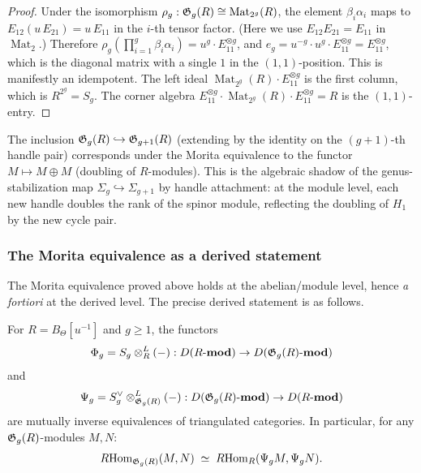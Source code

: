 \begin{proof}
Under the isomorphism
$\rho_g : \mathfrak{G}_g(R) \cong \operatorname{Mat}_{2^g}(R)$,
the element $\beta_i\alpha_i$ maps to
$E_{12}(u\,E_{21}) = u\,E_{11}$
in the $i$-th tensor factor.
(Here we use $E_{12}E_{21} = E_{11}$ in $\operatorname{Mat}_2$.)
Therefore
$\rho_g\!\left(\prod_{i=1}^g \beta_i\alpha_i\right)
= u^g \cdot E_{11}^{\otimes g}$,
and $e_g = u^{-g} \cdot u^g \cdot E_{11}^{\otimes g}
= E_{11}^{\otimes g}$, which is the diagonal matrix with
a single $1$ in the $(1,1)$-position.
This is manifestly an idempotent.
The left ideal $\operatorname{Mat}_{2^g}(R) \cdot E_{11}^{\otimes g}$
is the first column, which is $R^{2^g} = S_g$.
The corner algebra
$E_{11}^{\otimes g} \cdot \operatorname{Mat}_{2^g}(R)
\cdot E_{11}^{\otimes g} = R$ is the $(1,1)$-entry.
\end{proof}

\begin{remark}
The inclusion $\mathfrak{G}_g(R) \hookrightarrow \mathfrak{G}_{g+1}(R)$
(extending by the identity on the $(g{+}1)$-th handle pair)
corresponds under the Morita equivalence to the functor
$M \mapsto M \oplus M$ (doubling of $R$-modules).
This is the algebraic shadow of the genus-stabilization map
$\Sigma_g \hookrightarrow \Sigma_{g+1}$ by
handle attachment: at the module level, each new handle
doubles the rank of the spinor module, reflecting the
doubling of $H_1$ by the new cycle pair.
\end{remark}

\subsubsection{The Morita equivalence as a derived statement}

The Morita equivalence proved above holds at the
abelian/module level, hence \emph{a fortiori} at the derived level.
The precise derived statement is as follows.

\begin{theorem}
For $R = B_\Theta[u^{-1}]$ and $g \geq 1$, the functors
\[
\Phi_g = S_g \otimes_R^L (-) :
D(R\text{-}\mathbf{mod}) \to D(\mathfrak{G}_g(R)\text{-}\mathbf{mod})
\]
and
\[
\Psi_g = S_g^\vee \otimes_{\mathfrak{G}_g(R)}^L (-) :
D(\mathfrak{G}_g(R)\text{-}\mathbf{mod}) \to D(R\text{-}\mathbf{mod})
\]
are mutually inverse equivalences of triangulated categories.
In particular, for any $\mathfrak{G}_g(R)$-modules $M, N$:
\[
R\!\operatorname{Hom}_{\mathfrak{G}_g(R)}(M, N)
\;\simeq\;
R\!\operatorname{Hom}_R(\Psi_g M, \Psi_g N).
\]
\end{theorem}

